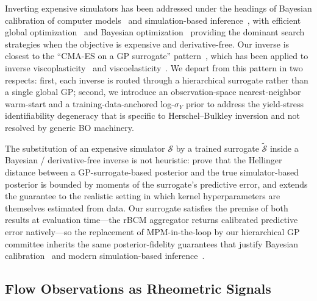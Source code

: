 Inverting expensive simulators has been addressed under the headings of
Bayesian calibration of computer models~\cite{kennedy2001bayesian} and
simulation-based inference~\cite{cranmer2020frontier}, with efficient
global optimization~\cite{jones1998efficient} and Bayesian
optimization~\cite{snoek2012practical,shahriari2016taking} providing the
dominant search strategies when the objective is expensive and
derivative-free. Our inverse is closest to the ``CMA-ES on a GP
surrogate'' pattern~\cite{bajaj2019gaussian,hansen2016cma}, which has
been applied to inverse
viscoplasticity~\cite{vandamme2021bayesian} and
viscoelasticity~\cite{hashemi2025bayesian}. We depart from this pattern
in two respects: first, each inverse is routed through a hierarchical
surrogate rather than a single global GP; second, we introduce an
observation-space nearest-neighbor warm-start and a
training-data-anchored log-$\sigma_Y$ prior to address the yield-stress
identifiability degeneracy that is specific to Herschel--Bulkley
inversion and not resolved by generic BO machinery.

The substitution of an expensive simulator $\mathcal{S}$ by a trained
surrogate $\tilde{\mathcal{S}}$ inside a Bayesian / derivative-free
inverse is not heuristic: \citet{stuart2018posterior} prove that the
Hellinger distance between a GP-surrogate-based posterior and the
true simulator-based posterior is bounded by moments of the
surrogate's predictive error, and \citet{teckentrup2020convergence}
extends the guarantee to the realistic setting in which kernel
hyperparameters are themselves estimated from data. Our surrogate
satisfies the premise of both results at evaluation time---the rBCM
aggregator returns calibrated predictive error natively---so the
replacement of MPM-in-the-loop by our hierarchical GP committee
inherits the same posterior-fidelity guarantees that justify
Bayesian calibration~\cite{kennedy2001bayesian} and modern
simulation-based inference~\cite{cranmer2020frontier}.


\subsection{Flow Observations as Rheometric Signals}

